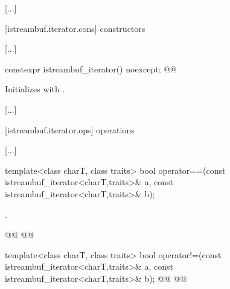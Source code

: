 [...]

\setcounter{subsubsection}{1}
[istreambuf.iterator.cons]{ constructors}

[...]

\setcounter{Paras}{1}
%
\begin{itemdecl}
constexpr istreambuf_iterator() noexcept;
@@
\end{itemdecl}

\begin{itemdescr}
\pnum
\effects
Initializes  with .
\end{itemdescr}

[...]

[istreambuf.iterator.ops]{ operations}

[...]

\setcounter{Paras}{5}
%
\begin{itemdecl}
template<class charT, class traits>
  bool operator==(const istreambuf_iterator<charT,traits>& a,
                  const istreambuf_iterator<charT,traits>& b);
\end{itemdecl}

\begin{itemdescr}
\pnum
\returns
{}.
\end{itemdescr}

\begin{addedblock}
{\color{newclr}
%
\begin{itemdecl}
@@
@@
\end{itemdecl}

\begin{itemdescr}
\pnum
{}
\end{itemdescr}
} %
\end{addedblock}

%
\begin{itemdecl}
template<class charT, class traits>
  bool operator!=(const istreambuf_iterator<charT,traits>& a,
                  const istreambuf_iterator<charT,traits>& b);
@@
@@
\end{itemdecl}

